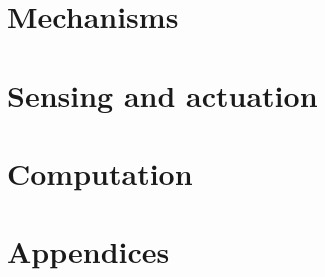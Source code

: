 \documentclass[paper=7in:9in,pagesize=pdftex,11pt,twoside,openright]{scrbook}
\begin{document}
\part{Mechanisms}





\part{Sensing and actuation}




\part{Computation}










\part{Appendices}
\appendix













\printindex
\end{document}
